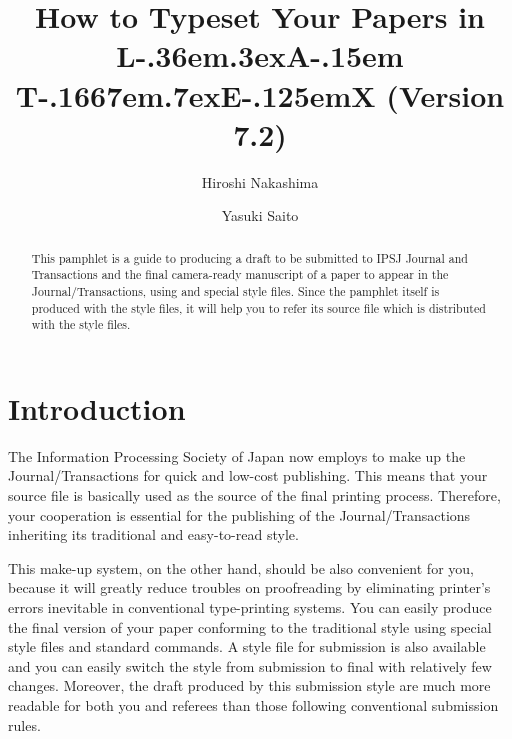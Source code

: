 \documentclass[english]{ipsjpapers}
\def\LATEx{\iLATEX{\normalsize\bf A}}
\def\LaTeX{\leavevmode\smash{\iLATEX{\sc a}}}
\def\iLATEX#1{L\kern-.36em\raise.3ex\hbox{#1}\kern-.15em
    T\kern-.1667em\lower.7ex\hbox{E}\kern-.125emX}
\begin{document}
\title[How to Typeset Your Papers in {\protect\LaTeX}]%
	{How to Typeset Your Papers in {\protect\LATEx} (Version 7.2)}
\author{Hiroshi Nakashima\and
	Yasuki Saito}


\begin{abstract}
This pamphlet is a guide to producing a draft to be submitted to IPSJ Journal
and Transactions and the final camera-ready manuscript of a paper to appear
in the Journal\slash Transactions, using {\LaTeX} and special style
files.  Since the pamphlet itself is produced with the style files, it will
help you to refer its source file which is distributed with the style files.
\end{abstract}

\maketitle


\section{Introduction}

The Information Processing Society of Japan now employs {\LaTeX} to make up
the Journal\slash Transactions for quick and low-cost publishing.  This
means that your {\LaTeX} source file is basically used as the source of the
final printing process.  Therefore, your cooperation is essential for the
publishing of the Journal\slash Transactions inheriting its traditional and
easy-to-read style.

This make-up system, on the other hand, should be also convenient for you,
because it will greatly reduce troubles on proofreading by eliminating
printer's errors inevitable in conventional type-printing systems.
You can easily produce the final version of your paper conforming to the
traditional style using special style files and standard {\LaTeX} commands.
A style file for submission is also available and you can easily switch the
style from submission to final with relatively few changes.
Moreover, the draft
produced by this submission style are much more readable for both you and
referees than those following conventional submission rules.
\end{document}
